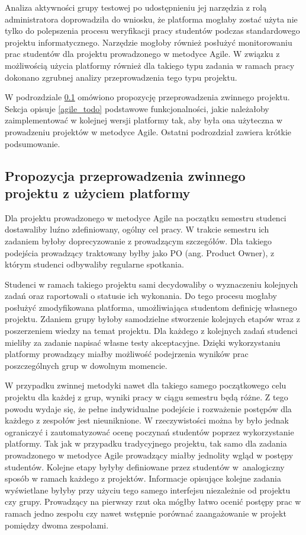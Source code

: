 Analiza aktywności grupy testowej po udostępnieniu jej narzędzia z rolą administratora doprowadziła do wniosku, że platforma mogłaby zostać użyta nie tylko do polepszenia procesu weryfikacji pracy studentów podczas standardowego projektu informatycznego.
Narzędzie mogłoby również posłużyć monitorowaniu prac studentów dla projektu prowadzonego w metodyce Agile.
W związku z możliwością użycia platformy również dla takiego typu zadania w ramach pracy dokonano zgrubnej analizy przeprowadzenia tego typu projektu.

W podrozdziale \ref{agile_proposition} omówiono propozycję przeprowadzenia zwinnego projektu.
Sekcja opisuje \ref{agile_todo} podstawowe funkcjonalności, jakie należałoby zaimplementować w kolejnej wersji platformy tak, aby była ona użyteczna w prowadzeniu projektów w metodyce Agile.
Ostatni podrozdział zawiera krótkie podsumowanie.

\subsection{Propozycja przeprowadzenia zwinnego projektu z użyciem platformy}
\label{agile_proposition}

Dla projektu prowadzonego w metodyce Agile na początku semestru studenci dostawaliby luźno zdefiniowany, ogólny cel pracy.
W trakcie semestru ich zadaniem byłoby doprecyzowanie z prowadzącym szczegółów.
Dla takiego podejścia prowadzący traktowany byłby jako PO (ang. Product Owner), z którym studenci odbywaliby regularne spotkania.

Studenci w ramach takiego projektu sami decydowaliby o wyznaczeniu kolejnych zadań oraz raportowali o statusie ich wykonania.
Do tego procesu mogłaby posłużyć zmodyfikowana platforma, umożliwiająca studentom definicję własnego projektu.
Zdaniem grupy byłoby samodzielne stworzenie kolejnych etapów wraz z poszerzeniem wiedzy na temat projektu.
Dla każdego z kolejnych zadań studenci mieliby za zadanie napisać własne testy akceptacyjne.
Dzięki wykorzystaniu platformy prowadzący miałby możliwość podejrzenia wyników prac poszczególnych grup w dowolnym momencie.

W przypadku zwinnej metodyki nawet dla takiego samego początkowego celu projektu dla każdej z grup, wyniki pracy w ciągu semestru będą różne.
Z tego powodu wydaje się, że pełne indywidualne podejście i rozważenie postępów dla każdego z zespołów jest nieuniknione.
W rzeczywistości można by było jednak ograniczyć i zautomatyzować ocenę poczynań studentów poprzez wykorzystanie platformy.
Tak jak w przypadku tradycyjnego projektu, tak samo dla zadania prowadzonego w metodyce Agile prowadzący miałby jednolity wgląd w postępy studentów.
Kolejne etapy byłyby definiowane przez studentów w~analogiczny sposób w ramach każdego z projektów.
Informacje opisujące kolejne zadania wyświetlane byłyby przy użyciu tego samego interfejsu niezależnie od projektu czy grupy.
Prowadzący na pierwszy rzut oka mógłby łatwo ocenić postępy prac w ramach jedno zespołu czy nawet wstępnie porównać zaangażowanie w projekt pomiędzy dwoma zespołami.

